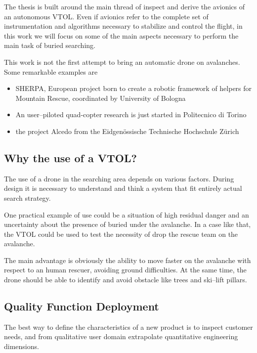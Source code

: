 The thesis is built around the main thread of inspect and derive the avionics of an autonomous VTOL. Even if avionics refer to the complete set of instrumentation and algorithms necessary to stabilize and control the flight, in this work we will focus on some of the main aspects necessary to perform the main task of buried searching.

This work is not the first attempt to bring an automatic drone on avalanches. Some remarkable examples are 
\begin{itemize}
\item SHERPA, European project born to create a robotic framework of helpers for Mountain Rescue, coordinated by University of Bologna
\item An user--piloted quad-copter research is just started in Politecnico di Torino
\item the project Alcedo from the Eidgen\"{o}ssische Technische Hochschule Z\"{u}rich\cite{projectAlcedoZurigo}
\end{itemize}

\subsection{Why the use of a VTOL?}
The use of a drone in the searching area depends on various factors. During design it is necessary to understand and think a system that fit entirely actual search strategy.

One practical example of use could be a situation of high residual danger and an uncertainty about the presence of buried under the avalanche. In a case like that, the VTOL could be used to test the necessity of drop the rescue team on the avalanche.

The main advantage is obviously the ability to move faster on the avalanche with respect to an human rescuer, avoiding ground difficulties. At the same time, the drone should be able to identify and avoid obstacle like trees and ski--lift pillars.

\subsection{Quality Function Deployment}
The best way to define the characteristics of a new product is to inspect customer needs, and from qualitative user domain extrapolate quantitative engineering dimensions\cite{akao1994development}.

